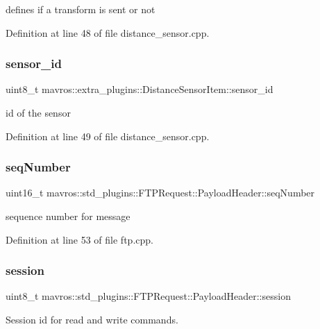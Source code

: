 defines if a transform is sent or not 



Definition at line 48 of file distance\+\_\+sensor.\+cpp.

\mbox{\label{group__plugin_gaeac19ed23b46f4e7a3cf3c02ed28da28}} 
\subsubsection{\texorpdfstring{sensor\_id}{sensor\_id}}
{\footnotesize\ttfamily uint8\+\_\+t mavros\+::extra\+\_\+plugins\+::\+Distance\+Sensor\+Item\+::sensor\+\_\+id}



id of the sensor 



Definition at line 49 of file distance\+\_\+sensor.\+cpp.

\mbox{\label{group__plugin_ga0bde534b62af463e4deeba5c0810dc9f}} 
\subsubsection{\texorpdfstring{seqNumber}{seqNumber}}
{\footnotesize\ttfamily uint16\+\_\+t mavros\+::std\+\_\+plugins\+::\+F\+T\+P\+Request\+::\+Payload\+Header\+::seq\+Number}



sequence number for message 



Definition at line 53 of file ftp.\+cpp.

\mbox{\label{group__plugin_ga1209ac70809aacaac73c8213101abee0}} 
\subsubsection{\texorpdfstring{session}{session}}
{\footnotesize\ttfamily uint8\+\_\+t mavros\+::std\+\_\+plugins\+::\+F\+T\+P\+Request\+::\+Payload\+Header\+::session}



Session id for read and write commands. 



